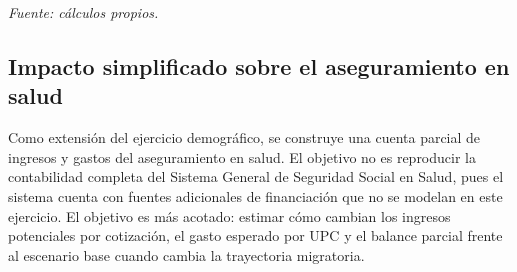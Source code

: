 \documentclass[12pt,a4paper]{article}
\begin{document}
\begin{table}[htbp]
\centering
\caption{Indicadores de dependencia y envejecimiento por escenario en años seleccionados.}
\label{tab:indicadores_tasas}
\small
{}
\vspace{0.2cm}
\par\footnotesize{\textit{Fuente: cálculos propios.}}
\end{table}

\subsection{Impacto simplificado sobre el aseguramiento en salud}

Como extensión del ejercicio demográfico, se construye una cuenta parcial de ingresos y gastos del aseguramiento en salud. El objetivo no es reproducir la contabilidad completa del Sistema General de Seguridad Social en Salud, pues el sistema cuenta con fuentes adicionales de financiación que no se modelan en este ejercicio. El objetivo es más acotado: estimar cómo cambian los ingresos potenciales por cotización, el gasto esperado por UPC y el balance parcial frente al escenario base cuando cambia la trayectoria migratoria.
\end{document}

